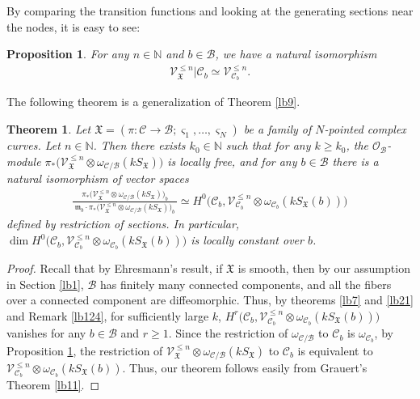 \documentclass[12pt,b5paper,notitlepage]{report}
\theoremstyle{definition}
\theoremstyle{plain}
\newtheorem{thm}[df]{Theorem}
\newtheorem{pp}[df]{Proposition}
\newcommand{\fk}{\mathfrak}
\newcommand{\mc}{\mathcal}
\newcommand{\scr}{\mathscr}
\newcommand{\sgm}{\varsigma}
\newcommand{\SX}{S_{\fk X}}
\newcommand{\mbb}{\mathbb}
\newcommand{\Nbb}{\mathbb N}
\numberwithin{equation}{section}
\begin{document}
By comparing the transition functions and looking at the generating sections near the nodes, it is easy to see:
\begin{pp}\label{lb26}
For any $n\in\Nbb$ and $b\in\mc B$, we have a natural isomorphism
\begin{align}
\scr V_{\fk X}^{\leq n}|\mc C_b\simeq\scr V_{\mc C_b}^{\leq n}.
\end{align}
\end{pp}

The following theorem is a generalization of Theorem \ref{lb9}. 

\begin{thm}\label{lb27}
Let $\fk X=(\pi:\mc C\rightarrow\mc B;\sgm_1,\dots,\sgm_N)$ be a family of $N$-pointed complex curves.  Let $n\in\Nbb$. Then  there exists $k_0\in\mbb N$ such that for any $k\geq k_0$, the $\scr O_{\mc B}$-module  $\pi_*\big(\scr V_{\fk X}^{\leq n}\otimes\omega_{\mc C/\mc B}(k\SX)\big)$ is locally free, and for any $b\in\mc B$ there is a natural isomorphism of vector spaces
\begin{align}
\frac{\pi_*\big(\scr V_{\fk X}^{\leq n}\otimes\omega_{\mc C/\mc B}(k\SX)\big)_b}{~\fk m_b\cdot\pi_*\big(\scr V_{\fk X}^{\leq n}\otimes\omega_{\mc C/\mc B}(k\SX)\big)_b~}\simeq H^0\big(\mc C_b,\scr V_{\mc C_b}^{\leq n}\otimes\omega_{\mc C_b}(k\SX(b))\big)
\end{align} 
defined by  restriction of sections. In particular,  $\dim  H^0\big(\mc C_b,\scr V_{\mc C_b}^{\leq n}\otimes\omega_{\mc C_b}(k\SX(b))\big)$ is locally constant over $b$.
\end{thm}

\begin{proof}
Recall that by Ehresmann's result, if $\fk X$ is smooth, then by our assumption in Section \ref{lb1}, $\mc B$  has finitely many connected components, and all the fibers over a connected component  are diffeomorphic.  Thus, by theorems \ref{lb7} and \ref{lb21} and Remark \ref{lb124}, for sufficiently large $k$, $H^r\big(\mc C_b,\scr V_{\mc C_b}^{\leq n}\otimes\omega_{\mc C_b}(k\SX(b))\big)$ vanishes for any $b\in\mc B$ and $r\geq 1$. Since the restriction of $\omega_{\mc C/\mc B}$ to $\mc C_b$ is $\omega_{\mc C_b}$, by Proposition \ref{lb26}, the restriction of $\scr V_{\fk X}^{\leq n}\otimes\omega_{\mc C/\mc B}(k\SX)$ to $\mc C_b$ is equivalent to $\scr V_{\mc C_b}^{\leq n}\otimes\omega_{\mc C_b}(k\SX(b))$.  Thus, our theorem follows easily from Grauert's Theorem \ref{lb11}.
\end{proof}
\end{document}
